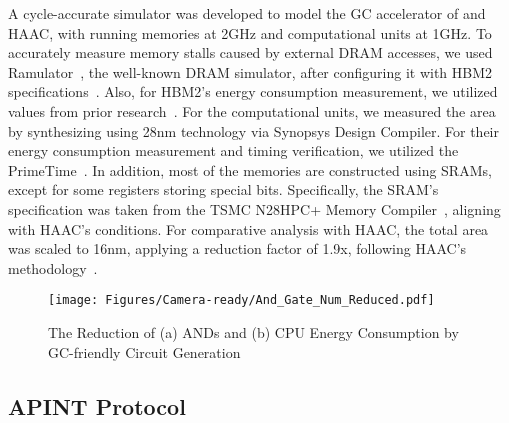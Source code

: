 A cycle-accurate simulator was developed to model the GC accelerator of \sysname and HAAC, with running memories at 2GHz and computational units at 1GHz. 
To accurately measure memory stalls caused by external DRAM accesses, we used Ramulator~\cite{kim2015ramulator}, the well-known DRAM simulator, after configuring it with HBM2 specifications~\cite{o2017fine}. Also, for HBM2's energy consumption measurement, we utilized values from prior research~\cite{o2017fine}.
For the computational units, we measured the area by synthesizing using 28nm technology via Synopsys Design Compiler. For their energy consumption measurement and timing verification, we utilized the PrimeTime~\cite{synopsysGoldStandard}.
In addition, most of the memories are constructed using SRAMs, except for some registers storing special bits. Specifically, the SRAM's specification was taken from the TSMC N28HPC+ Memory Compiler~\cite{usermanual, mo2023haac}, aligning with HAAC's conditions. 
For comparative analysis with HAAC, the total area was scaled to 16nm, applying a reduction factor of 1.9x, following HAAC’s methodology~\cite{statnano16FFFinFET, mo2023haac, statnanoTSMC20nm}.


\begin{figure} [t]
\vspace{-0.12in}
\centering
\texttt{[image: Figures/Camera-ready/And\_Gate\_Num\_Reduced.pdf]}
\caption{The Reduction of (a) ANDs and (b) CPU Energy Consumption by GC-friendly Circuit Generation}
\vspace{-0.2in}
\label{fig:netgen_result}
\end{figure}

\subsection{APINT Protocol}

